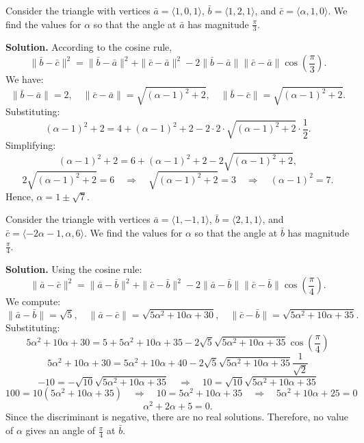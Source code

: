 \begin{examplebox}
Consider the triangle with vertices $\bar{a} = \langle 1,0,1 \rangle$, $\bar{b} = \langle 1,2,1 \rangle$, and $\bar{c} = \langle \alpha,1,0 \rangle$. We find the values for $\alpha$ so that the angle at $\bar{a}$ has magnitude $\frac{\pi}{3}$.

\vspace{0.5em}
\textbf{Solution.} According to the cosine rule,
\[
\|\bar{b} - \bar{c}\|^2 = \|\bar{b} - \bar{a}\|^2 + \|\bar{c} - \bar{a}\|^2 - 2\|\bar{b} - \bar{a}\|\|\bar{c} - \bar{a}\|\cos\left(\frac{\pi}{3}\right).
\]
We have:
\[
\|\bar{b} - \bar{a}\| = 2, \quad \|\bar{c} - \bar{a}\| = \sqrt{(\alpha - 1)^2 + 2}, \quad \|\bar{b} - \bar{c}\| = \sqrt{(\alpha - 1)^2 + 2}.
\]
Substituting:
\[
(\alpha - 1)^2 + 2 = 4 + (\alpha - 1)^2 + 2 - 2 \cdot 2 \cdot \sqrt{(\alpha - 1)^2 + 2} \cdot \frac{1}{2}.
\]
Simplifying:
\[
(\alpha - 1)^2 + 2 = 6 + (\alpha - 1)^2 + 2 - 2\sqrt{(\alpha - 1)^2 + 2},
\]
\[
2\sqrt{(\alpha - 1)^2 + 2} = 6 \quad \Rightarrow \quad \sqrt{(\alpha - 1)^2+2}=3 \quad \Rightarrow \quad (\alpha - 1)^2 = 7.
\]
Hence, $\alpha = 1 \pm \sqrt{7}$.
\end{examplebox}

\begin{examplebox}
Consider the triangle with vertices $\bar{a} = \langle 1,-1,1 \rangle$, $\bar{b} = \langle 2,1,1 \rangle$, and $\bar{c} = \langle -2\alpha - 1, \alpha, 6 \rangle$. We find the values for $\alpha$ so that the angle at $\bar{b}$ has magnitude $\frac{\pi}{4}$.

\vspace{0.5em}
\textbf{Solution.} Using the cosine rule:
\[
\|\bar{a} - \bar{c}\|^2 = \|\bar{a} - \bar{b}\|^2 + \|\bar{c} - \bar{b}\|^2 - 2\|\bar{a} - \bar{b}\|\|\bar{c} - \bar{b}\|\cos\left(\frac{\pi}{4}\right).
\]
We compute:
\[
\|\bar{a} - \bar{b}\| = \sqrt{5}, \quad \|\bar{a} - \bar{c}\| = \sqrt{5\alpha^2 + 10\alpha + 30}, \quad \|\bar{c} - \bar{b}\| = \sqrt{5\alpha^2 + 10\alpha + 35}.
\]
Substituting:
\[
5\alpha^2 + 10\alpha + 30 = 5 + 5\alpha^2 + 10\alpha + 35 - 2\sqrt{5}\sqrt{5\alpha^2+10\alpha+35}\cos\left(\frac{\pi}{4}\right)
\]
\[
5\alpha^2 + 10\alpha + 30 = 5\alpha^2 + 10\alpha + 40 - 2\sqrt{5}\sqrt{5\alpha^2+10\alpha+35}\frac{1}{\sqrt{2}}
\]
\[
-10 = -\sqrt{10}\sqrt{5\alpha^2+10\alpha+35} \quad \Rightarrow \quad 10 = \sqrt{10}\sqrt{5\alpha^2+10\alpha+35}
\]
\[
100 = 10(5\alpha^2+10\alpha+35) \quad \Rightarrow \quad 10=5\alpha^2+10\alpha+35 \quad \Rightarrow \quad 5\alpha^2+10\alpha+25 = 0
\]
\[
\alpha^2+2\alpha+5=0.
\]
Since the discriminant is negative, there are no real solutions. Therefore, no value of $\alpha$ gives an angle of $\frac{\pi}{4}$ at $\bar{b}$.
\end{examplebox}

